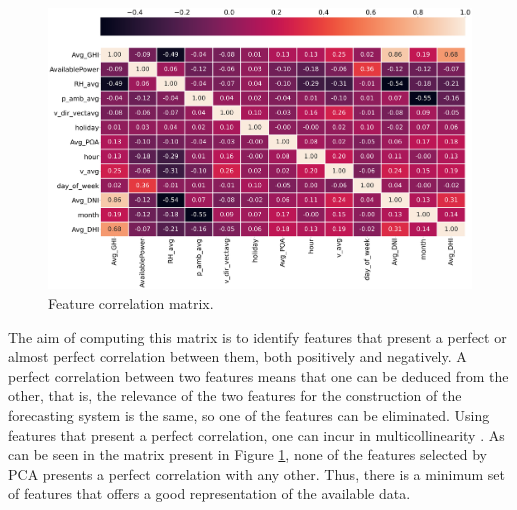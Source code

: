 \begin{figure}[h!]
    \centering
    \begin{center}
    \includegraphics[width=1\textwidth]{Images/corr1.PNG}
    \caption{Feature correlation matrix.}
    \label{corr}
    \end{center}
\end{figure}


The aim of computing this matrix is to identify features that present a perfect or almost perfect correlation between them, both positively and negatively. A perfect correlation between two features means that one can be deduced from the other, that is, the relevance of the two features for the construction of the forecasting system is the same, so one of the features can be eliminated. Using features that present a perfect correlation, one can incur in multicollinearity \cite{multicollinearity}. As can be seen in the matrix present in Figure \ref{corr}, none of the features selected by \ac{PCA} presents a perfect correlation with any other. Thus, there is a minimum set of features that offers a good representation of the available data.




